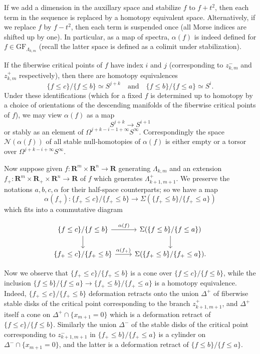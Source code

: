 \documentclass[12pt,a4paper]{article}
\numberwithin{equation}{section}
\theoremstyle{definition}
\theoremstyle{remark}
\newcommand{\R}{\mathbf{R}}
\newcommand{\NN}{\mathcal{N}}
\newcommand{\GF}{\mathrm{GF}}
\begin{document}
If we add a dimension in the auxillary space and stabilize $f$ to $f+t^2$, then each term in the sequence is replaced
by a homotopy equivalent space. Alternatively, if we replace $f$ by $f-t^2$, then each term is suspended once
(all Morse indices are shifted up by one). In particular, as a map of spectra, $\alpha(f)$ is indeed defined
for $f\in\GF_{\Lambda_{k,m}}$ (recall the latter space is defined as a colimit under stabilization).

If the fiberwise critical points of $f$ have index $i$ and $j$ (corresponding to $z_{k,m}^-$ and $z_{k,m}^+$ respectively),
then there are homotopy equivalences
\[\{f\le c\}/\{f \le b\}\simeq S^{j+k}\quad \text{and}\quad \{f\le b\}/\{f \le a\}\simeq S^i.\]
Under these identifications (which for a fixed $f$ is determined up to homotopy by a choice of orientations of the descending manifolds
of the fiberwise critical points of $f$), we may view $\alpha(f)$ as a map
\[S^{j+k}\to S^{i+1}\]
or stably as an element of $\Omega^{j+k-i-1+\infty}S^\infty$.
Correspondingly the space $\NN(\alpha(f))$ of all stable null-homotopies of $\alpha(f)$ is either empty
or a torsor over $\Omega^{j+k-i+\infty}S^\infty$.

Now suppose given $f: \R^m\times  \R^n \to \R$
generating $\Lambda_{k,m}$ and an extension $f_+:\R^m\times \R_+\times \R^n \to \R$ of $f$ which generates $\Lambda_{k+1,m+1}^+$.
We preserve the notations $a, b, c, \alpha$ for their half-space counterparts; so we have a map
\[\alpha(f_+):\{f_+ \le c\}/\{f_+ \le b\} \to \Sigma(\{f_+ \le b\}/\{f_+ \le a\})\]
which fits into a commutative diagram

\begin{equation}\label{eq:nullhomotopy1}
\begin{tikzcd}
\{f \le c\}/\{f \le b\} \arrow[r,"\alpha(f)"]\arrow[d] &\Sigma(\{f \le b\}/\{f \le a\})\arrow[d] \\
\{f_+ \le c\}/\{f_+ \le b\} \arrow[r,"\alpha(f_+)"]& \Sigma(\{f_+ \le b\}/\{f_+ \le a\}).
\end{tikzcd}
\end{equation}

Now we observe that $\{f_+ \le c\}/\{f_+ \le b\}$ is a cone over $\{f \le c\}/\{f \le b\}$, while the inclusion $\{f \le b\}/\{f \le a\}\to \{f_+ \le b\}/\{f_+ \le a\}$
is a homotopy equivalence. Indeed, $\{f_+\leq c\}/\{f_+\leq b\}$ deformation retracts onto the union $\Delta^+$ of fiberwise stable disks
of the critical point corresponding to the branch $z_{k+1,m+1}^+$, and $\Delta^+$ itself a cone on $\Delta^+\cap\{x_{m+1}=0\}$ which is a deformation retract of $\{f\leq c\}/\{f\leq b\}$. Similarly the union $\Delta^-$ of the stable disks of the critical point corresponding to $z_{k+1,m+1}^-$ in $\{f_+\leq b\}/\{f_+\leq a\}$
is a cylinder on $\Delta^-\cap\{x_{m+1}=0\}$, and the latter is a deformation retract of $\{f\leq b\}/\{f\leq a\}$.
\end{document}
